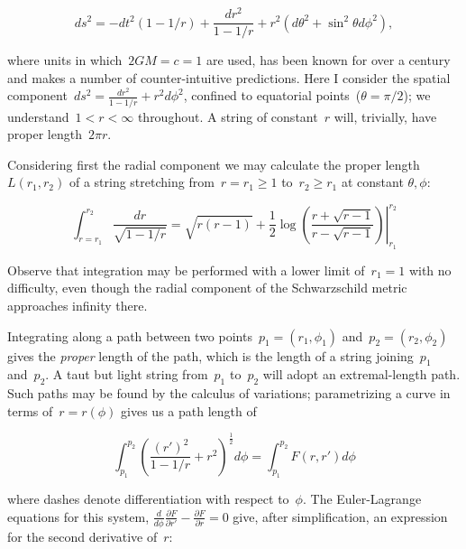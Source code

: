 \documentclass[times,twocolumn,final]{elsarticle}
\begin{document}
\begin{equation}\label{schwarzschild}
ds^2= -dt^2\left(1-1/r\right) +\frac{dr^2}{1-1/r} + r^2\left(d\theta^2 + \sin^2\theta d\phi^2\right),
\end{equation}

\noindent where units in which~$2GM=c=1$ are used, has been known for
over a century~\cite{schwarzschild1916} and makes a number of
counter-intuitive predictions.  Here I consider the spatial
component~$ds^2= \frac{dr^2}{1-1/r} + r^2d\phi^2$, confined to
equatorial points~($\theta=\pi/2$); we understand~$1<r<\infty$
throughout.  A string of constant~$r$ will, trivially, have proper
length~$2\pi r$.

Considering first the radial component we may calculate the
proper length $L\left(r_1,r_2\right)$ of a string stretching
from~$r=r_1\geq 1$ to~$r_2\geq r_1$ at constant $\theta,\phi$:

\begin{equation}\label{radial_string_length}
  \int_{r=r_1}^{r_2}\frac{dr}{\sqrt{1-1/r}}=
  \left.
  \sqrt{r(r-1)} +\frac{1}{2}\log\left(
  \frac{r+\sqrt{r-1}}{r-\sqrt{r-1}}\right)
  \right|_{r_1}^{r_2}
  \end{equation}

Observe that integration may be performed with a lower limit
of~$r_1=1$ with no difficulty, even though the radial component of the
Schwarzschild metric approaches infinity there.  

Integrating along a path between two
points~$p_1=\left(r_1,\phi_1\right)$ and~$p_2=\left(r_2,\phi_2\right)$
gives the {\em proper} length of the path, which is the length of a
string joining~$p_1$ and~$p_2$.  A taut but light string from~$p_1$
to~$p_2$ will adopt an extremal-length path.  Such paths may be found
by the calculus of variations; parametrizing a curve in terms
of~$r=r\left(\phi\right)$ gives us a path length of

\begin{equation}
  \int_{p_1}^{p_2}\left(\frac{\left(r'\right)^2}{1-1/r} + r^2\right)^\frac{1}{2}d\phi=
  \int_{p_1}^{p_2}F\left(r,r'\right)d\phi
\end{equation}

\noindent where dashes denote differentiation with respect to~$\phi$.  The
Euler-Lagrange equations for this system,
$\frac{d}{d\phi}\frac{\partial F}{\partial r'}-\frac{\partial
  F}{\partial r}=0$ give, after simplification, an expression for the
second derivative of~$r$:
\end{document}
